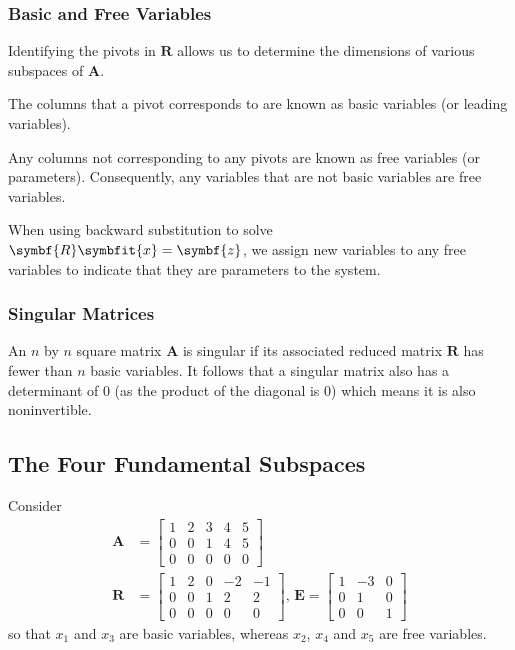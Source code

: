 \documentclass{article}
\begin{document}
\subsubsection{Basic and Free Variables}
Identifying the pivots in \(\symbf{R}\) allows us to determine
the dimensions of various subspaces of \(\symbf{A}\).
\begin{definition}
    The columns that a pivot corresponds to are known as basic variables (or leading variables).
\end{definition}
\begin{definition}
    Any columns not corresponding to any pivots are known as free variables (or parameters).
    Consequently, any variables that are not basic variables are free variables.
\end{definition}
When using backward substitution to solve \(\symbf{R} \symbfit{x} = \symbf{z}\), we assign new variables
to any free variables to indicate that they are parameters to the system.
\subsubsection{Singular Matrices}
An \(n\) by \(n\) square matrix \(\symbf{A}\) is singular if its associated reduced matrix \(\symbf{R}\) has fewer than \(n\) basic variables.
It follows that a singular matrix also has a determinant of 0 (as the product of the diagonal is 0) which means it is also noninvertible.
\subsection{The Four Fundamental Subspaces}
Consider
\begin{align*}
    \symbf{A} & =
    \begin{bmatrix}
        1 & 2 & 3 & 4 & 5 \\
        0 & 0 & 1 & 4 & 5 \\
        0 & 0 & 0 & 0 & 0
    \end{bmatrix} \\
    \symbf{R} & =
    \begin{bmatrix}
        1 & 2 & 0 & -2 & -1 \\
        0 & 0 & 1 & 2  & 2  \\
        0 & 0 & 0 & 0  & 0
    \end{bmatrix}, \,
    \symbf{E} =
    \begin{bmatrix}
        1 & -3 & 0 \\
        0 & 1  & 0 \\
        0 & 0  & 1
    \end{bmatrix}
\end{align*}
so that \(x_1\) and \(x_3\) are basic variables, whereas \(x_2\), \(x_4\) and \(x_5\) are free variables.
\end{document}
